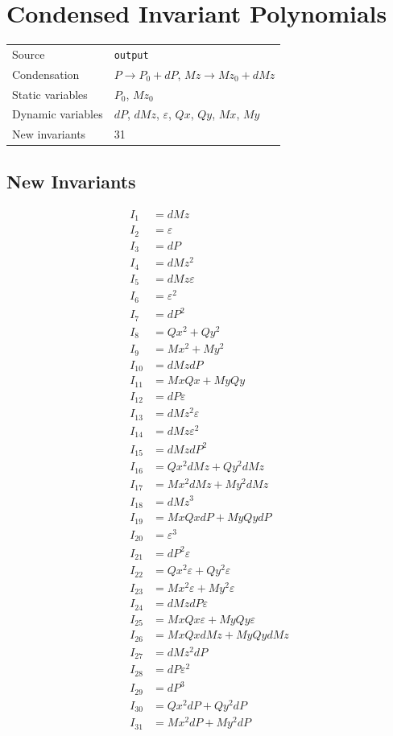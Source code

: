 \documentclass{article}
\begin{document}
\section*{Condensed Invariant Polynomials}

\begin{tabular}{ll}
\toprule
Source & \texttt{output} \\
Condensation & $P \to P_{0} + dP$, $Mz \to Mz_{0} + dMz$ \\
Static variables & $P_{0}$, $Mz_{0}$ \\
Dynamic variables & $dP$, $dMz$, $ε$, $Qx$, $Qy$, $Mx$, $My$ \\
New invariants & 31 \\
\bottomrule
\end{tabular}

\subsection*{New Invariants}

\begin{align*}
I_{1} &= dMz \\
I_{2} &= ε \\
I_{3} &= dP \\
I_{4} &= dMz^{2} \\
I_{5} &= dMz ε \\
I_{6} &= ε^{2} \\
I_{7} &= dP^{2} \\
I_{8} &= Qx^{2} + Qy^{2} \\
I_{9} &= Mx^{2} + My^{2} \\
I_{10} &= dMz dP \\
I_{11} &= Mx Qx + My Qy \\
I_{12} &= dP ε \\
I_{13} &= dMz^{2} ε \\
I_{14} &= dMz ε^{2} \\
I_{15} &= dMz dP^{2} \\
I_{16} &= Qx^{2} dMz + Qy^{2} dMz \\
I_{17} &= Mx^{2} dMz + My^{2} dMz \\
I_{18} &= dMz^{3} \\
I_{19} &= Mx Qx dP + My Qy dP \\
I_{20} &= ε^{3} \\
I_{21} &= dP^{2} ε \\
I_{22} &= Qx^{2} ε + Qy^{2} ε \\
I_{23} &= Mx^{2} ε + My^{2} ε \\
I_{24} &= dMz dP ε \\
I_{25} &= Mx Qx ε + My Qy ε \\
I_{26} &= Mx Qx dMz + My Qy dMz \\
I_{27} &= dMz^{2} dP \\
I_{28} &= dP ε^{2} \\
I_{29} &= dP^{3} \\
I_{30} &= Qx^{2} dP + Qy^{2} dP \\
I_{31} &= Mx^{2} dP + My^{2} dP \\
\end{align*}
\end{document}
